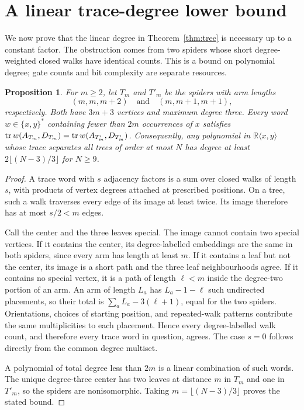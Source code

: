 \documentclass[11pt,letterpaper]{article}
\newtheorem{proposition}[theorem]{Proposition}
\theoremstyle{definition}\newtheorem{definition}[theorem]{Definition}
\theoremstyle{remark}\newtheorem{remark}[theorem]{Remark}
\newcommand{\R}{\mathbb R}\newcommand{\Q}{\mathbb Q}\newcommand{\Z}{\mathbb Z}
\begin{document}
\section{A linear trace-degree lower bound}\label{sec:lower}
We now prove that the linear degree in Theorem~\ref{thm:tree} is necessary up to a constant factor. The obstruction comes from two spiders whose short degree-weighted closed walks have identical counts. This is a bound on polynomial degree; gate counts and bit complexity are separate resources.

\begin{proposition}\label{prop:lower}
For $m\ge2$, let $T_m$ and $T'_m$ be the spiders with arm lengths
\[
(m,m,m+2)\quad\text{and}\quad(m,m+1,m+1),
\]
respectively. Both have $3m+3$ vertices and maximum degree three. Every word $w\in\{x,y\}^{*}$ containing fewer than $2m$ occurrences of $x$ satisfies $\operatorname{tr} w(A_{T_m},D_{T_m})=\operatorname{tr} w(A_{T'_m},D_{T'_m})$. Consequently, any polynomial in $\R\langle x,y\rangle$ whose trace separates all trees of order at most $N$ has degree at least $2\lfloor(N-3)/3\rfloor$ for $N\ge9$.
\end{proposition}
\begin{proof}
A trace word with $s$ adjacency factors is a sum over closed walks of length $s$, with products of vertex degrees attached at prescribed positions. On a tree, such a walk traverses every edge of its image at least twice. Its image therefore has at most $s/2<m$ edges.

Call the center and the three leaves special. The image cannot contain two special vertices. If it contains the center, its degree-labelled embeddings are the same in both spiders, since every arm has length at least $m$. If it contains a leaf but not the center, its image is a short path and the three leaf neighbourhoods agree. If it contains no special vertex, it is a path of length $\ell<m$ inside the degree-two portion of an arm. An arm of length $L_a$ has $L_a-1-\ell$ such undirected placements, so their total is $\sum_a L_a-3(\ell+1)$, equal for the two spiders. Orientations, choices of starting position, and repeated-walk patterns contribute the same multiplicities to each placement. Hence every degree-labelled walk count, and therefore every trace word in question, agrees. The case $s=0$ follows directly from the common degree multiset.

A polynomial of total degree less than $2m$ is a linear combination of such words. The unique degree-three center has two leaves at distance $m$ in $T_m$ and one in $T'_m$, so the spiders are nonisomorphic. Taking $m=\lfloor(N-3)/3\rfloor$ proves the stated bound.
\end{proof}
\end{document}
